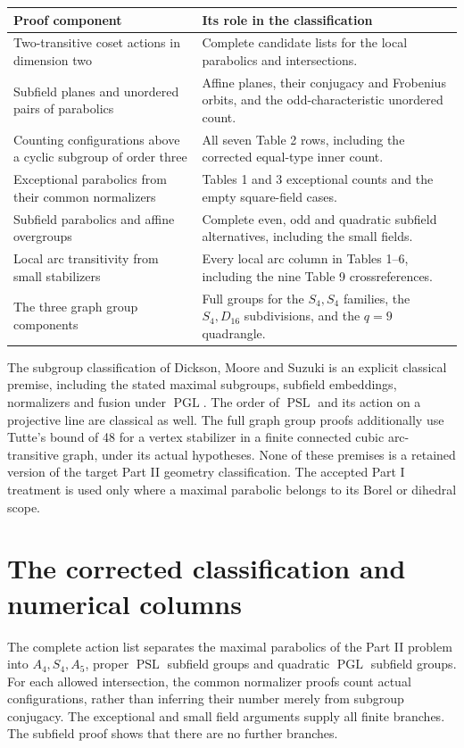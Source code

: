 \documentclass[11pt]{article}
\newcommand{\PSL}{\operatorname{PSL}}\newcommand{\PGL}{\operatorname{PGL}}
\begin{document}
\begin{center}
\begin{tabular}{p{}p{}}
\toprule
Proof component & Its role in the classification\\\midrule
Two-transitive coset actions in dimension two & Complete candidate lists
for the local parabolics and intersections.\\
Subfield planes and unordered pairs of parabolics & Affine planes, their
conjugacy and Frobenius orbits, and the odd-characteristic unordered
count.\\
Counting configurations above a cyclic subgroup of order three & All seven Table 2 rows,
including the corrected equal-type inner count.\\
Exceptional parabolics from their common normalizers & Tables 1 and 3
exceptional counts and the empty square-field cases.\\
Subfield parabolics and affine overgroups & Complete even, odd and
quadratic subfield alternatives, including the small fields.\\
Local arc transitivity from small stabilizers & Every local arc column
in Tables 1--6, including the nine Table 9 crossreferences.\\
The three graph group components & Full groups for the $S_4,S_4$
families, the $S_4,D_{16}$ subdivisions, and the $q=9$ quadrangle.\\
\bottomrule
\end{tabular}
\end{center}

The subgroup classification of Dickson, Moore and Suzuki is an explicit
classical premise, including the stated maximal subgroups, subfield
embeddings, normalizers and fusion under $\PGL$. The order of $\PSL$
and its action on a projective line are classical as well. The full graph
group proofs additionally use Tutte's bound of 48 for a vertex stabilizer
in a finite connected cubic arc-transitive graph, under its actual
hypotheses. None of these premises is a retained version of the target
Part II geometry classification. The accepted Part I treatment is used
only where a maximal parabolic belongs to its Borel or dihedral scope.

\section{The corrected classification and numerical columns}
The complete action list separates the maximal parabolics of the Part II
problem into $A_4,S_4,A_5$, proper $\PSL$ subfield groups and quadratic
$\PGL$ subfield groups. For each allowed intersection, the common
normalizer proofs count actual configurations, rather than inferring
their number merely from subgroup conjugacy. The exceptional and small
field arguments supply all finite branches. The subfield proof shows
that there are no further branches.
\end{document}
